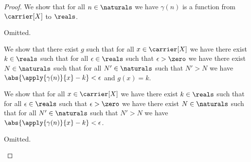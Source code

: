 \begin{proof}

    We show that for all $n \in \naturals$ we have $\gamma(n)$ 
    is a function from $\carrier[X]$ to $\reals$.
    \begin{subproof}
        Omitted.
    \end{subproof}



    We show that there exist $g$ such that 
    for all $x \in \carrier[X]$ we have
    there exist $k \in \reals$ such that
    for all $\epsilon \in \reals$ such that $\epsilon > \zero$ we have
    there exist $N \in \naturals$ such that
    for all $N' \in \naturals$ such that $N' > N$ we have
    $\abs{\apply{\gamma(n)}{x} - k} < \epsilon$ and $g(x)= k$.
    \begin{subproof}

%
%
        
        We show that for all $x \in \carrier[X]$ we have
        there exist $k \in \reals$ such that
        for all $\epsilon \in \reals$ such that $\epsilon > \zero$ we have
        there exist $N \in \naturals$ such that
        for all $N' \in \naturals$ such that $N' > N$ we have
        $\abs{\apply{\gamma(n)}{x} - k} < \epsilon$.
        \begin{subproof}
            Omitted.
        \end{subproof}


    \end{subproof}


    






\end{proof}
